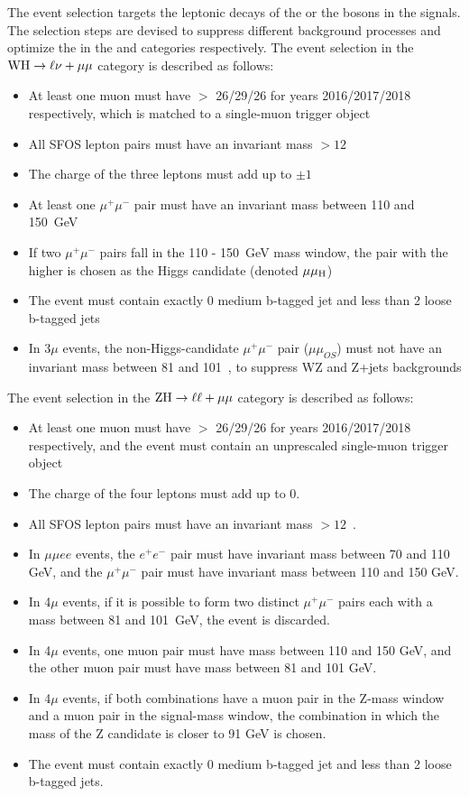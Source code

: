 The event selection targets the leptonic decays of the \PW or the \PZ bosons in the \VH signals.
The selection steps are devised to suppress different background processes 
and optimize the \SoB in the \WH and \ZH categories respectively. 
The event selection in the $\mathrm{W}\mathrm{H} \to \ell\nu+\mu\mu$ category is described as follows:
\begin{itemize}
	\item At least one muon must have \pt $>$ 26\GeV /29\GeV /26\GeV 
	      for years 2016/2017/2018 respectively, which is matched to a
              single-muon trigger object
	\item All SFOS lepton pairs must have an invariant mass $> 12$~\GeV
	\item The charge of the three leptons must add up to $\pm 1$
	\item At least one $\mu^{+}\mu^{-}$ pair must have an invariant mass between 110
	      and 150~GeV
	\item If two $\mu^{+}\mu^{-}$ pairs fall in the 110 - 150~GeV mass window, the pair
	      with the higher \pt is chosen as the Higgs candidate (denoted $\mu\mu_{\mathrm{H}}$)
	\item The event must contain exactly 0 medium b-tagged jet and less than 2 loose b-tagged jets
	\item In 3$\mu$ events, the non-Higgs-candidate $\mu^{+}\mu^{-}$ pair ($\mu\mu_{OS}$) must
	      not have an invariant mass between 81 and 101~\GeV, to suppress WZ and Z+jets backgrounds
\end{itemize}
The event selection in the $\mathrm{Z}\mathrm{H} \to \ell\ell + \mu\mu$ category is described as follows:
\begin{itemize}
	\item At least one muon must have \pt $>$ 26\GeV /29\GeV /26\GeV 
	      for years 2016/2017/2018 respectively, and the event must
	      contain an unprescaled single-muon trigger object
	\item The charge of the four leptons must add up to 0.
	\item All SFOS lepton pairs must have an invariant mass $> 12$~\GeV.
	\item In $\mu\mu ee$ events, the $e^{+}e^{-}$ pair must have invariant mass between 70 and 110 GeV, and the $\mu^{+}\mu^{-}$ pair must have invariant mass between 110 and 150 GeV.
	\item In 4$\mu$ events, if it is possible to form two distinct $\mu^{+}\mu^{-}$ pairs
          each with a mass between 81 and 101~GeV, the event is discarded.
	\item In 4$\mu$ events, one muon pair must have mass between 110 and 150 GeV, and the other muon pair must have mass between 81 and 101 GeV.
	\item In 4$\mu$ events, if both combinations have a muon pair in the Z-mass window and a muon pair in the signal-mass window, the combination in which the mass of the Z candidate is closer to 91 GeV is chosen. 
	\item The event must contain exactly 0 medium b-tagged jet and less than 2 loose b-tagged jets.    
\end{itemize}
